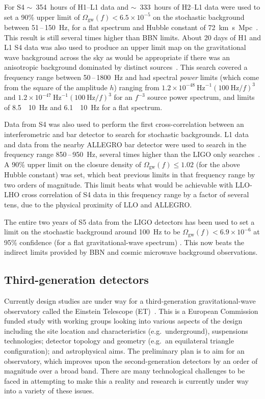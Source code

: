 For S4 $\sim$~354~hours of H1--L1 data and $\sim$~333~hours of H2--L1 data were
used to set a 90\% upper limit of $\Omega_{\mathrm{gw}}(f) < 6.5\times10^{-5}$ on
the stochastic background between 51\,--\,150~Hz, for a flat spectrum and Hubble
constant of 72~km~s~Mpc~\cite{Abbott:2007e}. This result is
still several times higher than BBN limits. About 20 days of H1 and L1 S4 data
was also used to produce an upper limit map on the gravitational wave background
across the sky as would be appropriate if there was an anisotropic background
dominated by distinct sources~\cite{Abbott:2007f}. This search covered a
frequency range between 50\,--\,1800~Hz and had spectral \textit{power} limits (which
come from the square of the amplitude $h$) ranging from
$1.2\times10^{-48} \mathrm{\ Hz}^{-1} (100 \mathrm{\ Hz}/f)^3$ and
$1.2\times10^{-47} \mathrm{\ Hz}^{-1} (100 \mathrm{\ Hz}/f)^3$ for an
$f^{-3}$ source power spectrum, and limits of
8.5~\texttimes~10~Hz and
6.1~\texttimes~10~Hz for a flat spectrum.


Data from S4 was also used to perform the first cross-correlation between an
interferometric and bar detector to search for stochastic backgrounds. L1 data
and data from the nearby ALLEGRO bar detector were used to search in the
frequency range 850\,--\,950~Hz, several times higher than the LIGO only
searches~\cite{Abbott:2007g}. A 90\% upper limit on the closure
density of $\Omega_{\mathrm{gw}}(f) \leq 1.02$ (for the above Hubble
constant) was set, which beat previous limits in that frequency range
by two orders of magnitude. This limit beats what would be achievable
with LLO-LHO cross correlation of S4 data in this frequency range by a
factor of several tens, due to the physical proximity of LLO and ALLEGRO.


The entire two years of S5 data from the LIGO detectors has been used to set a
limit on the stochastic background around 100~Hz to be $\Omega_{\mathrm{gw}}(f) <
6.9\times10^{-6}$ at 95\% confidence (for a flat gravitational-wave spectrum)
\cite{Abbott:2009b}. This now beats the indirect limits provided by BBN and cosmic microwave background observations.


\subsection{Third-generation detectors}
\label{subsec:et} 

Currently design studies are under way for a third-generation gravitational-wave
observatory called the Einstein Telescope (ET)~\cite{ETweb}. This is a European
Commission funded study with working groups looking into various aspects of the
design including the site location and characteristics (e.g.\, underground),
suspensions technologies; detector topology and geometry (e.g.\, an equilateral
triangle configuration); and astrophysical aims. The preliminary plan is to
aim for an observatory, which improves upon the second-generation detectors by
an order of magnitude over a broad band. There are many technological challenges
to be faced in attempting to make this a reality and research is currently under
way into a variety of these issues.


